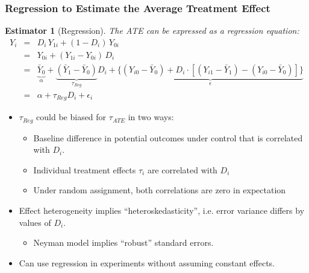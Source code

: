 \documentclass{beamer}
\numberwithin{equation}{section}
\newtheorem{esti}{Estimator}
\begin{document}
\begin{frame}
  \frametitle{Regression to Estimate the Average Treatment Effect}
\small
\begin{esti}[Regression]\small
The ATE can be expressed as a regression equation:
\begin{eqnarray*}
  Y_i &=& D_i\, Y_{1i} + (1-D_i)\, Y_{0i} \\
   &=& Y_{0i} + (Y_{1i}- Y_{0i})\,D_i \\
   &=& \underbrace{\bar Y_0}_{\alpha} + \underbrace{(\bar Y_1 - \bar Y_0)}_{\tau_{Reg}} D_i + \underbrace{\{(Y_{i0} - \bar Y_0) + D_i \cdot [(Y_{i1} - \bar Y_1) - (Y_{i0} - \bar Y_0)] \}}_{\epsilon} \\ 
   &=& \alpha + \tau_{Reg} D_i + \epsilon_i
 \end{eqnarray*}
\end{esti}\vspace{-.2in}
\begin{itemize}
\item   $\tau_{Reg}$ could be biased for $\tau_{ATE}$ in two ways: \pause
  \begin{itemize}
  \item Baseline difference in potential outcomes under control that is correlated with $D_i$. 
  \item Individual treatment effects $\tau_i$ are correlated with $D_i$ 
  \item Under random assignment, both correlations are zero in expectation
  \end{itemize}\pause
\item
  Effect heterogeneity implies ``heteroskedasticity'', i.e. error variance differs by values of $D_i$.
  \begin{itemize}
  \item  Neyman model implies ``robust'' standard errors. 
  \end{itemize}
\item
  Can use regression in experiments without assuming constant effects.
\end{itemize}



\end{frame}
\end{document}
